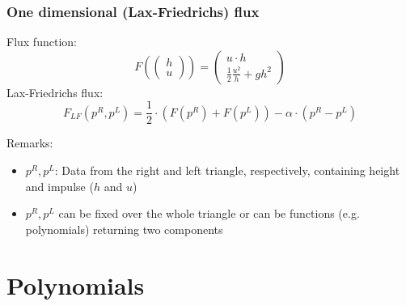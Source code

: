 \documentclass{beamer}
\newcommand{\todo}[1]{
  \textcolor{red}{TODO: #1}
  \note{\textcolor{red}{TODO: #1}}
}
\renewcommand{\todo}[1]{}
\begin{document}
\begin{frame}
  \frametitle{One dimensional (Lax-Friedrichs) flux}
  Flux function:
  \begin{equation}
    \label{eq:flux-function-definition}
    F\left(
      \begin{pmatrix}
        h \\ u
      \end{pmatrix}
    \right) = 
    \begin{pmatrix}
      u \cdot h \\
      \frac{1}{2} \frac{u^2}{h} + g h^2 
    \end{pmatrix}
  \end{equation}
  Lax-Friedrichs flux:
  \begin{equation}
    \label{eq:lax-friedrich-definition}
    F_{LF}(p^R,p^L) = \dfrac{1}{2}\cdot (F(p^R) + F(p^L)) - \alpha \cdot (p^R - p^L)
  \end{equation}
  \begin{block}{Remarks:}
    \begin{itemize}
    \item $p^R, p^L$: Data from the right and left triangle, respectively, containing height and impulse ($h$ and $u$)
    \item $p^R, p^L$ can be fixed over the whole triangle or can be functions (e.g. polynomials) returning two components
    \todo{Muesen wir das mit fixed ueberhaupt erwaehnen? Ist ja nur ein Spezialfall von Polynomen}
    \end{itemize}
  \end{block}
\end{frame}

\section{Polynomials}
\label{sec:constructing-polynomials}
\end{document}

